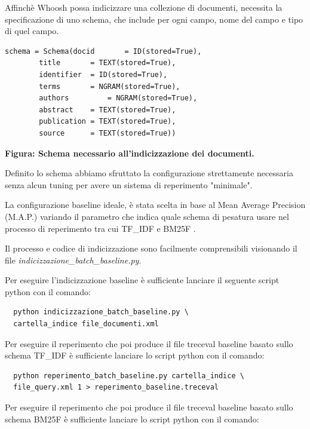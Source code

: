 \documentclass[runningheads]{llncs}
\begin{document}
Affinch\`e Whoosh possa indicizzare una collezione di documenti, necessita la
specificazione di uno schema, che include per ogni campo, nome del campo
e tipo di quel campo. \par

\begin{lstlisting}
schema = Schema(docid      	= ID(stored=True),
		title      	= TEXT(stored=True),
		identifier	= ID(stored=True),
		terms 		= NGRAM(stored=True),
		authors      	= NGRAM(stored=True),
		abstract 	= TEXT(stored=True),
		publication	= TEXT(stored=True),
		source 		= TEXT(stored=True))
\end{lstlisting}
\begin{tablenotes}
      \small
      \item \bf Figura: Schema necessario all'indicizzazione dei documenti. 
    \end{tablenotes}


Definito lo schema abbiamo sfruttato la configurazione strettamente necessaria senza alcun tuning per avere 
un sistema di reperimento "minimale". 

La configurazione baseline ideale, \`e stata scelta in base al Mean Average Precision (M.A.P.)\cite{WBC_map} variando il parametro che indica quale schema di 
pesatura usare nel processo di reperimento tra cui TF\_IDF e BM25F .

 Il processo e codice di indicizzazione sono  facilmente comprensibili visionando il file  \emph{indicizzazione\_batch\_baseline.py}. \par
\lstset{
  language=bash,
  basicstyle=\ttfamily
}

Per eseguire l'indicizzazione  baseline \`e sufficiente lanciare il seguente script python con il comando:
\begin{lstlisting}
  python indicizzazione_batch_baseline.py \ 
  cartella_indice file_documenti.xml
\end{lstlisting}

Per eseguire il reperimento che poi produce il file treceval baseline basato sullo schema TF\_IDF \`e sufficiente lanciare 
lo script python con il comando:

\begin{lstlisting}
  python reperimento_batch_baseline.py cartella_indice \
  file_query.xml 1 > reperimento_baseline.treceval
\end{lstlisting}

Per eseguire il reperimento che poi produce il file treceval baseline basato sullo schema BM25F \`e sufficiente lanciare 
lo script python con il comando:
\end{document}
